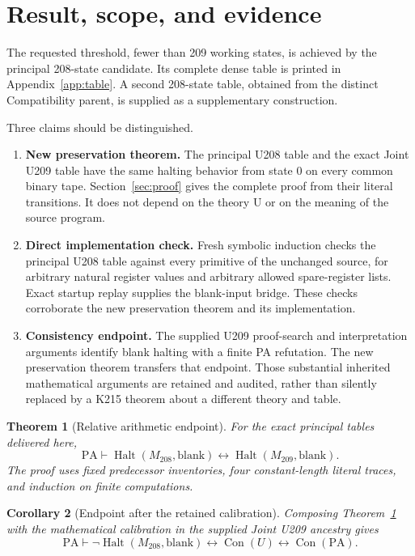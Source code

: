 \documentclass[11pt,letterpaper]{article}
\newtheorem{theorem}{Theorem}[section]
\newtheorem{corollary}[theorem]{Corollary}
\newcommand{\PA}{\mathrm{PA}}
\newcommand{\Con}{\operatorname{Con}}
\newcommand{\Halt}{\operatorname{Halt}}
\newcommand{\old}{M_{209}}
\newcommand{\newm}{M_{208}}
\begin{document}
\section{Result, scope, and evidence}
\label{sec:result}

The requested threshold, fewer than 209 working states, is achieved by the
principal 208-state candidate. Its complete dense table is printed in
Appendix~\ref{app:table}. A second 208-state table, obtained from the distinct
Compatibility parent, is supplied as a supplementary construction.

Three claims should be distinguished.
\begin{enumerate}
\item \textbf{New preservation theorem.} The principal U208 table and the
exact Joint U209 table have the same halting behavior from state 0 on every
common binary tape. Section~\ref{sec:proof} gives the complete proof from
their literal transitions. It does not depend on the theory U or on the
meaning of the source program.
\item \textbf{Direct implementation check.} Fresh symbolic induction
checks the principal U208 table against every primitive of the unchanged
source, for arbitrary natural register values and arbitrary allowed
spare-register lists. Exact startup replay supplies the blank-input bridge.
These checks corroborate the new preservation theorem and its implementation.
\item \textbf{Consistency endpoint.} The supplied U209 proof-search and
interpretation arguments identify blank halting with a finite PA refutation.
The new preservation theorem transfers that endpoint. Those substantial
inherited mathematical arguments are retained and audited, rather than
silently replaced by a K215 theorem about a different theory and table.
\end{enumerate}

\begin{theorem}[Relative arithmetic endpoint]
\label{thm:relative}
For the exact principal tables delivered here,
\[
\PA\vdash\Halt(\newm,\mathrm{blank})
\leftrightarrow\Halt(\old,\mathrm{blank}).
\]
The proof uses fixed predecessor inventories, four constant-length literal
traces, and induction on finite computations.
\end{theorem}

\begin{corollary}[Endpoint after the retained calibration]
\label{cor:endpoint}
Composing Theorem~\ref{thm:relative} with the mathematical calibration in
the supplied Joint U209 ancestry gives
\[
\PA\vdash
\neg\Halt(\newm,\mathrm{blank})
\leftrightarrow\Con(U)
\leftrightarrow\Con(\PA).
\]
\end{corollary}
\end{document}
